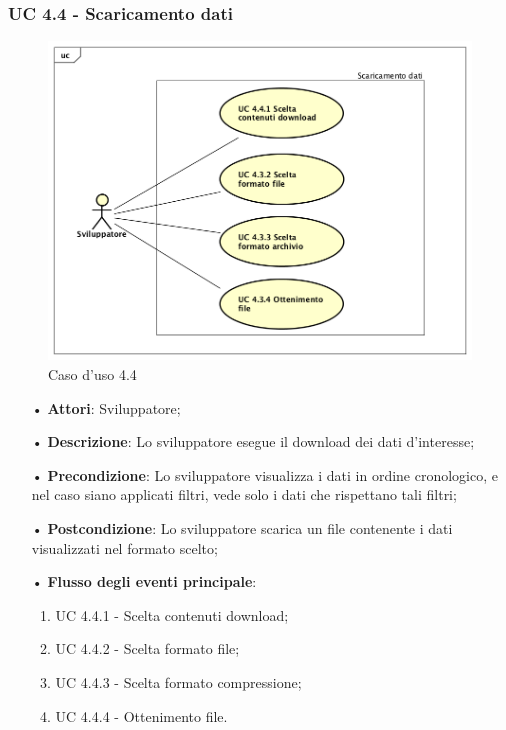 \subsubsection{UC 4.4 - Scaricamento dati}
\begin{figure}[H]
\centering
\includegraphics[width=17cm]{img/UC440.png} 
\caption{Caso d'uso 4.4}\label{fig:440}
\end{figure}
\begin{itemize}
\item[•]\textbf{Attori}: Sviluppatore;
\item[•]\textbf{Descrizione}: Lo sviluppatore esegue il download dei dati d'interesse;
\item[•]\textbf{Precondizione}: Lo sviluppatore visualizza i dati in ordine cronologico, e nel caso siano applicati filtri, vede solo i dati che rispettano tali filtri;
\item[•]\textbf{Postcondizione}:  Lo sviluppatore scarica un file contenente i dati visualizzati nel formato scelto;
\item[•]\textbf{Flusso degli eventi principale}:
\begin{enumerate}
\item UC 4.4.1 - Scelta contenuti download;
\item UC 4.4.2 - Scelta formato file;
\item UC 4.4.3 - Scelta formato compressione;
\item UC 4.4.4 - Ottenimento file.
\end{enumerate}
\end{itemize}

